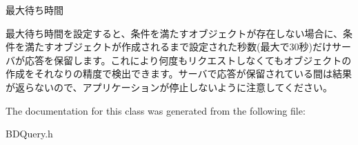 最大待ち時間 

最大待ち時間を設定すると、条件を満たすオブジェクトが存在しない場合に、条件を満たすオブジェクトが作成されるまで設定された秒数(最大で30秒)だけサーバが応答を保留します。これにより何度もリクエストしなくてもオブジェクトの作成をそれなりの精度で検出できます。サーバで応答が保留されている間は結果が返らないので、アプリケーションが停止しないように注意してください。 

The documentation for this class was generated from the following file\-:\begin{DoxyCompactItemize}
\item 
B\-D\-Query.\-h\end{DoxyCompactItemize}
